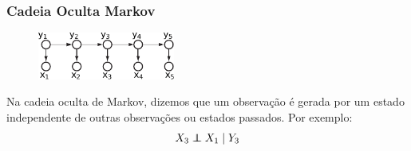 \begin{frame}[allowframebreaks]
  \frametitle{Cadeia Oculta Markov}
        \begin{figure}[h!]
        \centering
        \includegraphics[width=0.4\textwidth]{images/hmm.pdf}
        \label{fig:hmm}
        \end{figure}
  Na cadeia oculta de Markov, dizemos que um observação é gerada por um estado independente de outras observações ou estados passados.
  Por exemplo:
	\begin{equation}
        X_3 \independent X_1 \mid Y_3
        \end{equation}

  \framebreak


\end{frame}

